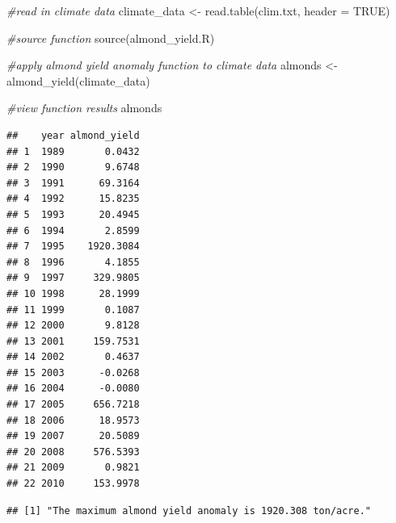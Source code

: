 \documentclass[
]{article}
\newenvironment{Shaded}{\begin{snugshade}}{\end{snugshade}}
\newcommand{\AttributeTok}[1]{\textcolor[rgb]{0.77,0.63,0.00}{#1}}
\newcommand{\CommentTok}[1]{\textcolor[rgb]{0.56,0.35,0.01}{\textit{#1}}}
\newcommand{\ConstantTok}[1]{\textcolor[rgb]{0.00,0.00,0.00}{#1}}
\newcommand{\DecValTok}[1]{\textcolor[rgb]{0.00,0.00,0.81}{#1}}
\newcommand{\FunctionTok}[1]{\textcolor[rgb]{0.00,0.00,0.00}{#1}}
\newcommand{\NormalTok}[1]{#1}
\newcommand{\OtherTok}[1]{\textcolor[rgb]{0.56,0.35,0.01}{#1}}
\newcommand{\SpecialCharTok}[1]{\textcolor[rgb]{0.00,0.00,0.00}{#1}}
\newcommand{\StringTok}[1]{\textcolor[rgb]{0.31,0.60,0.02}{#1}}
\begin{document}
\begin{Shaded}
\begin{Highlighting}[]
\CommentTok{\#read in climate data}
\NormalTok{climate\_data }\OtherTok{\textless{}{-}} \FunctionTok{read.table}\NormalTok{(}\StringTok{\textquotesingle{}clim.txt\textquotesingle{}}\NormalTok{, }\AttributeTok{header =} \ConstantTok{TRUE}\NormalTok{)}

\CommentTok{\#source function}
\FunctionTok{source}\NormalTok{(}\StringTok{\textquotesingle{}almond\_yield.R\textquotesingle{}}\NormalTok{)}

\CommentTok{\#apply almond yield anomaly function to climate data}
\NormalTok{almonds }\OtherTok{\textless{}{-}} \FunctionTok{almond\_yield}\NormalTok{(climate\_data)}

\CommentTok{\#view function results}
\NormalTok{almonds}
\end{Highlighting}
\end{Shaded}

\begin{verbatim}
##    year almond_yield
## 1  1989       0.0432
## 2  1990       9.6748
## 3  1991      69.3164
## 4  1992      15.8235
## 5  1993      20.4945
## 6  1994       2.8599
## 7  1995    1920.3084
## 8  1996       4.1855
## 9  1997     329.9805
## 10 1998      28.1999
## 11 1999       0.1087
## 12 2000       9.8128
## 13 2001     159.7531
## 14 2002       0.4637
## 15 2003      -0.0268
## 16 2004      -0.0080
## 17 2005     656.7218
## 18 2006      18.9573
## 19 2007      20.5089
## 20 2008     576.5393
## 21 2009       0.9821
## 22 2010     153.9978
\end{verbatim}

\begin{Shaded}
\end{Shaded}

\begin{verbatim}
## [1] "The maximum almond yield anomaly is 1920.308 ton/acre."
\end{verbatim}
\end{document}
